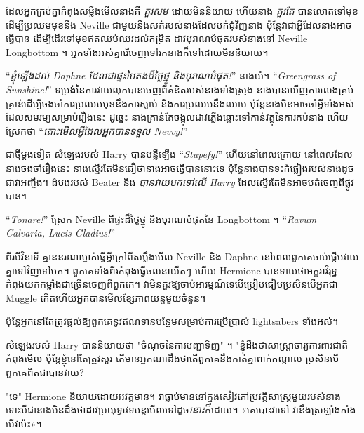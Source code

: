 ដែលអ្នកគ្រប់គ្នាកំពុងសម្លឹងមើលនាងគឺ \emph{គួរសម} ដោយមិននិយាយ ហើយនាង \emph{គួរតែ} បានលោតទៅមុខដើម្បីប្រឈមមុខនឹង Neville ជាមួយនឹងសក់របស់នាងដែលបក់ជុំវិញនាង ប៉ុន្តែវាជាអ្វីដែលនាងអាចធ្វើបាន ដើម្បីដើរទៅមុខឥតឈប់ឈរដល់កម្រិត ដាវបុរាណបំផុតរបស់នាងនៅ Neville Longbottom ។ អ្នក​ទាំង​អស់​គ្នា​រើ​ចេញ​ទៅ​រក​នាង​ក៏​ទៅ​ដោយ​មិន​និយាយ។

“\emph{ខ្ញុំឡើងដល់ Daphne ដែលជាផ្ទះបៃតងដ៏ថ្លៃថ្នូ និងបុរាណបំផុត!}” នាងយំ។ “\emph{Greengrass of Sunshine!}” ទម្រង់នៃការវាយលុកបានចេញពីគំនិតរបស់នាងទាំងស្រុង នាងបានឃើញការលេងគ្រប់គ្រាន់ដើម្បីចងចាំការប្រឈមមុខនឹងការស្លាប់ និងការប្រឈមនឹងឈាម ប៉ុន្តែនាងមិនអាចចាំអ្វីទាំងអស់ដែលសមរម្យសម្រាប់រឿងនេះ ដូច្នេះ នាង​គ្រាន់​តែ​ចង្អុល​ដាវ​ភ្លើង​ឆ្ពោះ​ទៅ​កាន់​វត្ថុ​នៃ​ការ​គប់​នាង ហើយ​ស្រែក​ថា “\emph{តោះ​មើល​អ្វី​ដែល​អ្នក​បាន​ទទួល Nevvy!}”

ជាថ្មីម្តងទៀត សំឡេងរបស់ Harry បានបន្លឺឡើង “\emph{Stupefy!}” ហើយនៅពេលក្រោយ នៅពេលដែលនាងចងចាំរឿងនេះ នាងស្ទើរតែមិនជឿថានាងអាចធ្វើបាននោះទេ ប៉ុន្តែនាងបានទះកំផ្លៀងរបស់នាងដូចជាវាអញ្ចឹង។ ដំបងរបស់ Beater និង \emph{បានវាយបកទៅលើ Harry} ដែលស្ទើរតែមិនអាចបត់ចេញពីផ្លូវបាន។

“\emph{Tonare!}” ស្រែក Neville ពីផ្ទះដ៏ថ្លៃថ្នូ និងបុរាណបំផុតនៃ Longbottom ។ “\emph{Ravum Calvaria, Lucis Gladius!}”

\later

ពីរបីវិនាទី គ្មាននរណាម្នាក់ធ្វើអ្វីក្រៅពីសម្លឹងមើល Neville និង Daphne នៅពេលពួកគេចាប់ផ្តើមវាយគ្នាទៅវិញទៅមក។ ពួកគេទាំងពីរកំពុងធ្វើចលនាយឺតៗ ហើយ Hermione បានទាយថាអក្ខរាវិរុទ្ធកំពុងយកកម្លាំងជាច្រើនចេញពីពួកគេ។ វាមិនគួរឱ្យចាប់អារម្មណ៍ទេបើប្រៀបធៀបប្រសិនបើអ្នកជា Muggle កើតហើយអ្នកបានមើលខ្សែភាពយន្តមួយចំនួន។

ប៉ុន្តែអ្នកនៅតែត្រូវផ្តល់ឱ្យពួកគេនូវឥណទានបន្ថែមសម្រាប់ការប្រើប្រាស់ lightsabers ទាំងអស់។

សំឡេងរបស់ Harry បាននិយាយថា "ចំណុចនៃការបញ្ជាទិញ" ។ "ខ្ញុំដឹងថាសាស្ត្រាចារ្យការពារជាតិកំពុងមើល ប៉ុន្តែខ្ញុំនៅតែត្រូវសួរ តើមានអ្នកណាដឹងថាតើពួកគេនឹងកាត់គ្នាពាក់កណ្តាល ប្រសិនបើពួកគេពិតជាបានវាយ?

"ទេ" Hermione និយាយដោយអវត្តមាន។ វាធ្លាប់មាននៅក្នុងសៀវភៅប្រវត្តិសាស្ត្រមួយរបស់នាង ទោះបីជានាងមិនដឹងថាដាវប្រយុទ្ធវេទមន្តមើលទៅដូច\emph{នោះ}ក៏ដោយ។ «គេ​បោះ​វា​ទៅ វា​នឹង​ស្រឡាំងកាំង​បើ​វា​ប៉ះ»។


